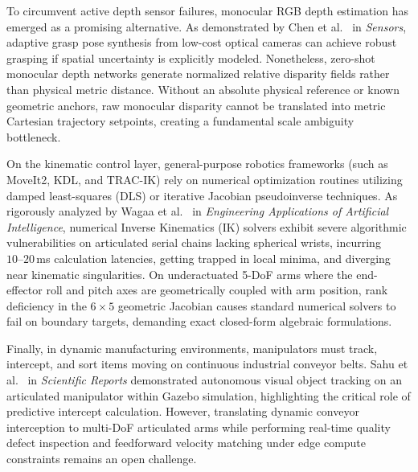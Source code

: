 \documentclass[journal]{IEEEtran}
\begin{document}
To circumvent active depth sensor failures, monocular RGB depth estimation has emerged as a promising alternative. As demonstrated by Chen et al.~\cite{aria_116_authors_2025_adaptive} in \textit{Sensors}, adaptive grasp pose synthesis from low-cost optical cameras can achieve robust grasping if spatial uncertainty is explicitly modeled. Nonetheless, zero-shot monocular depth networks generate normalized relative disparity fields rather than physical metric distance. Without an absolute physical reference or known geometric anchors, raw monocular disparity cannot be translated into metric Cartesian trajectory setpoints, creating a fundamental scale ambiguity bottleneck.

On the kinematic control layer, general-purpose robotics frameworks (such as MoveIt2, KDL, and TRAC-IK) rely on numerical optimization routines utilizing damped least-squares (DLS) or iterative Jacobian pseudoinverse techniques. As rigorously analyzed by Wagaa et al.~\cite{aria_040_wagaa_2023_analytical} in \textit{Engineering Applications of Artificial Intelligence}, numerical Inverse Kinematics (IK) solvers exhibit severe algorithmic vulnerabilities on articulated serial chains lacking spherical wrists, incurring $10\text{--}20$\,ms calculation latencies, getting trapped in local minima, and diverging near kinematic singularities. On underactuated 5-DoF arms where the end-effector roll and pitch axes are geometrically coupled with arm position, rank deficiency in the $6\times5$ geometric Jacobian causes standard numerical solvers to fail on boundary targets, demanding exact closed-form algebraic formulations.

Finally, in dynamic manufacturing environments, manipulators must track, intercept, and sort items moving on continuous industrial conveyor belts. Sahu et al.~\cite{aria_010_sahu_2025_autonomous} in \textit{Scientific Reports} demonstrated autonomous visual object tracking on an articulated manipulator within Gazebo simulation, highlighting the critical role of predictive intercept calculation. However, translating dynamic conveyor interception to multi-DoF articulated arms while performing real-time quality defect inspection and feedforward velocity matching under edge compute constraints remains an open challenge.
\end{document}
